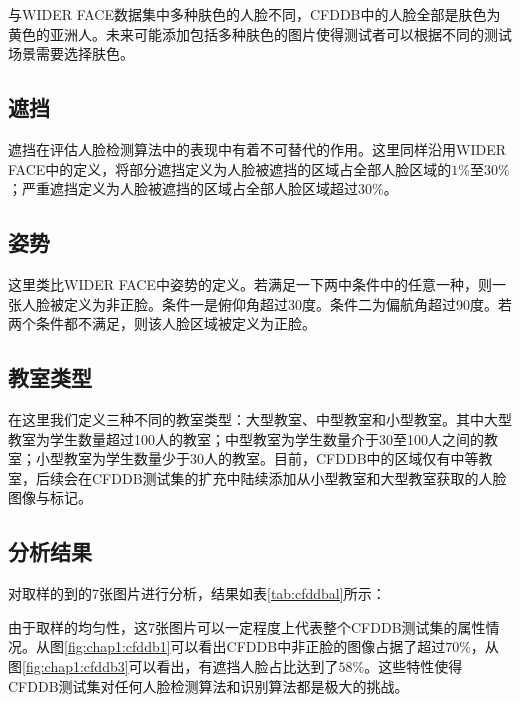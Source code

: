 与WIDER FACE数据集中多种肤色的人脸不同，CFDDB中的人脸全部是肤色为黄色的亚洲人。未来可能添加包括多种肤色的图片使得测试者可以根据不同的测试场景需要选择肤色。

\subsection{遮挡}

遮挡在评估人脸检测算法中的表现中有着不可替代的作用。这里同样沿用WIDER FACE中的定义，将部分遮挡定义为人脸被遮挡的区域占全部人脸区域的$1\%$至$30\%$；严重遮挡定义为人脸被遮挡的区域占全部人脸区域超过$30\%$。

\subsection{姿势}

这里类比WIDER FACE中姿势的定义。若满足一下两中条件中的任意一种，则一张人脸被定义为非正脸。条件一是俯仰角超过30度。条件二为偏航角超过90度。若两个条件都不满足，则该人脸区域被定义为正脸。

\subsection{教室类型}

在这里我们定义三种不同的教室类型：大型教室、中型教室和小型教室。其中大型教室为学生数量超过100人的教室；中型教室为学生数量介于30至100人之间的教室；小型教室为学生数量少于30人的教室。目前，CFDDB中的区域仅有中等教室，后续会在CFDDB测试集的扩充中陆续添加从小型教室和大型教室获取的人脸图像与标记。

\subsection{分析结果}

对取样的到的7张图片进行分析，结果如表\ref{tab:cfddbal}所示：

由于取样的均匀性，这7张图片可以一定程度上代表整个CFDDB测试集的属性情况。从图\ref{fig:chap1:cfddb1}可以看出CFDDB中非正脸的图像占据了超过$70\%$，从图\ref{fig:chap1:cfddb3}可以看出，有遮挡人脸占比达到了$58\%$。这些特性使得CFDDB测试集对任何人脸检测算法和识别算法都是极大的挑战。

